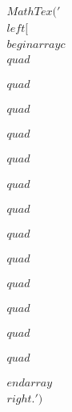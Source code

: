 \documentclass[preview]{standalone}
\begin{document}
\begin{align*}
MathTex('\\left[\\begin{array}{c}\\quad \\\\\\quad \\\\\\quad \\\\\\quad \\\\\\quad \\\\\\quad \\\\\\quad \\\\\\quad \\\\\\quad \\\\\\quad \\\\\\quad \\\\\\quad \\\\\\quad \\\\\\end{array}\\right.')
\end{align*}
\end{document}
